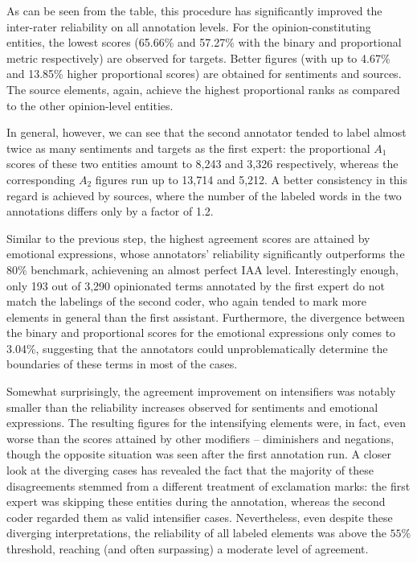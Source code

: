 As can be seen from the table, this procedure has significantly
improved the inter-rater reliability on all annotation levels.  For
the opinion-constituting entities, the lowest scores (65.66\% and
57.27\% with the binary and proportional metric respectively) are
observed for targets.  Better figures (with up to 4.67\% and 13.85\%
higher proportional scores) are obtained for sentiments and sources.
The source elements, again, achieve the highest proportional ranks as
compared to the other opinion-level entities.

In general, however, we can see that the second annotator tended to
label almost twice as many sentiments and targets as the first expert:
the proportional $A_1$ scores of these two entities amount to 8,243
and 3,326 respectively, whereas the corresponding $A_2$ figures run up
to 13,714 and 5,212.  A better consistency in this regard is achieved
by sources, where the number of the labeled words in the two
annotations differs only by a factor of 1.2.

Similar to the previous step, the highest agreement scores are
attained by emotional expressions, whose annotators' reliability
significantly outperforms the 80\% benchmark, achievening an almost
perfect IAA level.  Interestingly enough, only 193 out of 3,290
opinionated terms annotated by the first expert do not match the
labelings of the second coder, who again tended to mark more elements
in general than the first assistant.  Furthermore, the divergence
between the binary and proportional scores for the emotional
expressions only comes to 3.04\%, suggesting that the annotators could
unproblematically determine the boundaries of these terms in most of
the cases.

Somewhat surprisingly, the agreement improvement on intensifiers was
notably smaller than the reliability increases observed for sentiments
and emotional expressions.  The resulting figures for the intensifying
elements were, in fact, even worse than the scores attained by other
modifiers -- diminishers and negations, though the opposite situation
was seen after the first annotation run.  A closer look at the
diverging cases has revealed the fact that the majority of these
disagreements stemmed from a different treatment of exclamation marks:
the first expert was skipping these entities during the annotation,
whereas the second coder regarded them as valid intensifier cases.
Nevertheless, even despite these diverging interpretations, the
reliability of all labeled elements was above the $55\%$ threshold,
reaching (and often surpassing) a moderate level of agreement.

